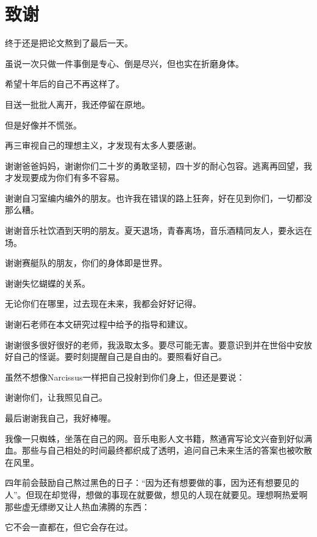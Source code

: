 \chapter[致谢]{致\quad 谢}
\pagestyle{mainmatterstyle}


终于还是把论文熬到了最后一天。

虽说一次只做一件事倒是专心、倒是尽兴，但也实在折磨身体。

希望十年后的自己不再这样了。

目送一批批人离开，我还停留在原地。

但是好像并不慌张。

再三审视自己的理想主义，才发现有太多人要感谢。

谢谢爸爸妈妈，谢谢你们二十岁的勇敢坚韧，四十岁的耐心包容。逃离再回望，我才发现要成为你们有多不容易。

谢谢自习室编内编外的朋友。也许我在错误的路上狂奔，好在见到你们，一切都没那么糟。

谢谢音乐社饮酒到天明的朋友。夏天退场，青春离场，音乐酒精同友人，要永远在场。

谢谢赛艇队的朋友，你们的身体即是世界。

谢谢失忆蝴蝶的关系。

无论你们在哪里，过去现在未来，我都会好好记得。

谢谢石老师在本文研究过程中给予的指导和建议。

谢谢很多很好很好的老师，我汲取太多。要尽可能无害。要意识到并在世俗中安放好自己的怪诞。要时刻提醒自己是自由的。要照看好自己。

虽然不想像Narcissus一样把自己投射到你们身上，但还是要说：

谢谢你们，让我照见自己。

最后谢谢我自己，我好棒喔。

我像一只蜘蛛，坐落在自己的网。音乐电影人文书籍，熬通宵写论文兴奋到好似满血。那些与自己相处的时间最终都织成了透明，追问自己未来生活的答案也被吹散在风里。

四年前会鼓励自己熬过黑色的日子：“因为还有想要做的事，因为还有想要见的人”。但现在却觉得，想做的事现在就要做，想见的人现在就要见。理想啊热爱啊那些虚无缥缈又让人热血沸腾的东西：

它不会一直都在，但它会存在过。



\cleardoublepage[plain]
